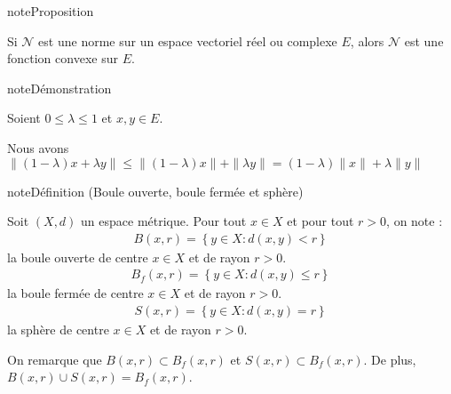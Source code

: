 \documentclass[letterpaper,10pt,french]{sphinxmanual}
\begin{document}
\begin{sphinxadmonition}{note}{Proposition}

\sphinxAtStartPar
Si \(\mathcal N\) est une norme sur un espace vectoriel réel ou complexe \(E\), alors
\(\mathcal N\) est une fonction convexe sur \(E\).
\end{sphinxadmonition}

\begin{sphinxadmonition}{note}{Démonstration}

\sphinxAtStartPar
Soient \(0\leq \lambda \leq 1\) et \(x, y \in E\).

\sphinxAtStartPar
Nous avons \(\|(1-\lambda)x+ \lambda y\| \leq \|(1-\lambda)x\|+ \|\lambda y\| = (1-\lambda)\|x\|+ \lambda \| y\|\)
\end{sphinxadmonition}

\begin{sphinxadmonition}{note}{Définition (Boule ouverte, boule fermée et sphère)}

\sphinxAtStartPar
Soit \((X,d)\) un espace métrique. Pour tout \(x\in X\) et pour tout \(r>0\), on note :
\begin{equation*}
\begin{split}
B(x,r) = \left\{y\in X: d(x,y)<r  \right\} 
\end{split}
\end{equation*}
\sphinxAtStartPar
la boule ouverte de centre \(x\in X\) et de rayon \(r>0\).
\begin{equation*}
\begin{split}
B_f(x,r) = \left\{y\in X: d(x,y)\leq r  \right\}
\end{split}
\end{equation*}
\sphinxAtStartPar
la boule fermée de centre \(x\in X\) et de rayon \(r>0\).
\begin{equation*}
\begin{split}
S(x,r) = \left\{y\in X: d(x,y)= r  \right\}
\end{split}
\end{equation*}
\sphinxAtStartPar
la sphère de centre \(x\in X\) et de rayon \(r>0\).
\end{sphinxadmonition}

\sphinxAtStartPar
On remarque que \(B(x,r) \subset B_f(x,r)\) et \(S(x,r) \subset B_f(x,r)\). De plus, \(B(x,r)\cup S(x,r) = B_f(x,r)\).
\end{document}
